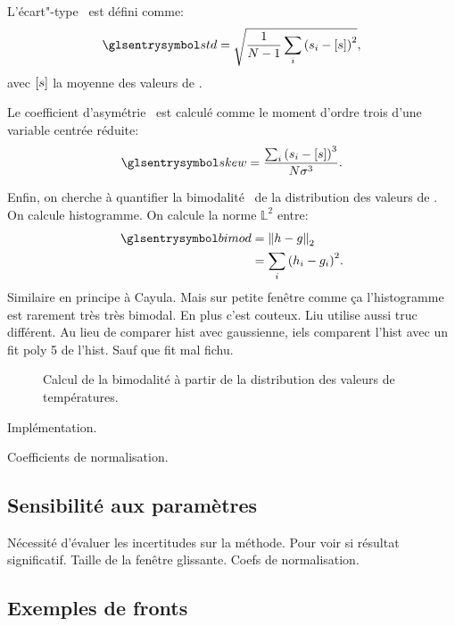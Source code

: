 \documentclass[index]{subfiles}
\begin{document}
L'écart"-type~ est défini comme:
\begin{equation}
  \am{std} = \sqrt{\frac{1}{N-1} \sum_i {\left(s_i - \moy{s} \right)}^2},
\end{equation}
avec \(\left[s\right]\) la moyenne des valeurs de .

Le coefficient d'asymétrie~ est calculé comme le moment d'ordre trois d'une variable centrée réduite:
\begin{equation}
  \am{skew} = \frac{\sum_i {\left(s_i - \moy{s}\right)}^3} {N \sigma^3}.
\end{equation}

Enfin, on cherche à quantifier la bimodalité~ de la distribution des valeurs de .
On calcule histogramme.
On calcule la norme \(\mathbb{L}^2\) entre:
\begin{equation}
  \begin{split}
  \am{bimod} & = \norm[2]{h - g}\\
             & = \sum_i {\left(h_i - g_i\right)}^2 .
  \end{split}
\end{equation}
Similaire en principe à Cayula.
Mais sur petite fenêtre comme ça l'histogramme est rarement très très bimodal. En plus c'est couteux.
Liu utilise aussi truc différent.
Au lieu de comparer hist avec gaussienne, iels comparent l'hist avec un fit poly 5 de l'hist. Sauf que fit mal fichu.

\begin{figure}
  \centering
  \caption[Calcul de la bimodalité]{Calcul de la bimodalité à partir de la distribution des valeurs de températures.}
  \label{fig:bimodality}
\end{figure}

Implémentation.

Coefficients de normalisation.

\subsection{Sensibilité aux paramètres}
\label{sec:HI-sensibilite}

Nécessité d'évaluer les incertitudes sur la méthode.
Pour voir si résultat significatif.
Taille de la fenêtre glissante. Coefs de normalisation.

\subsection{Exemples de fronts}
\label{sec:HI-exemples}
\end{document}
